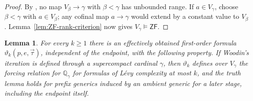 \documentclass[11pt,a4paper]{amsart}
\newcommand{\ZF}{\mathsf{ZF}}
\theoremstyle{plain}
\newtheorem{lemma}[theorem]{Lemma}
\theoremstyle{definition}
\theoremstyle{remark}
\begin{document}
\begin{proof}

By \cite[Definition~19 and the proof of Theorem~44]{Spoerl}, no map $V_\beta\to\gamma$ with $\beta<\gamma$ has unbounded range.  If $a\in V_\gamma$, choose $\beta<\gamma$ with $a\in V_\beta$; any cofinal map $a\to\gamma$ would extend by a constant value to $V_\beta$.  Lemma~\ref{lem:ZF-rank-criterion} now gives $V_\gamma\models\ZF$.
\end{proof}

\begin{lemma}\label{lem:Woodin-endpoint-forcing}
{For every $k\geq1$ there is an effectively obtained first-order formula $\vartheta_k(p,e,\vec\tau)$, independent of the endpoint, with the following property.  If Woodin's iteration is defined through a supercompact cardinal $\gamma$, then $\vartheta_k$ defines over $V_\gamma$ the forcing relation for $\mathbb Q_\gamma$ for formulas of L\'evy complexity at most $k$, {\color{auditgreen}and the truth lemma holds for prefix generics induced by an ambient generic for a later stage, including the endpoint itself.}}
\end{lemma}
\end{document}
